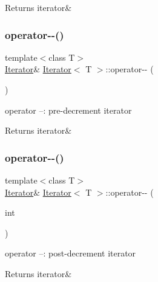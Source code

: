 \begin{DoxyReturn}{Returns}
iterator\& 
\end{DoxyReturn}
\mbox{\label{class_iterator_a580d645f1163cd20b92b469477324509}} 
\subsubsection{\texorpdfstring{operator-\/-\/()}{operator--()}\hspace{0.1cm}{\footnotesize\ttfamily [1/2]}}
{\footnotesize\ttfamily template$<$class T$>$ \\
\hyperlink{class_iterator}{Iterator}\& \hyperlink{class_iterator}{Iterator}$<$ T $>$\+::operator-\/-\/ (\begin{DoxyParamCaption}{ }\end{DoxyParamCaption})\hspace{0.3cm}{\ttfamily [inline]}}



operator --\+: pre-\/decrement iterator 

\begin{DoxyReturn}{Returns}
iterator\& 
\end{DoxyReturn}
\mbox{\label{class_iterator_a96b7f620a07d11a31335e8b43609625e}} 
\subsubsection{\texorpdfstring{operator-\/-\/()}{operator--()}\hspace{0.1cm}{\footnotesize\ttfamily [2/2]}}
{\footnotesize\ttfamily template$<$class T$>$ \\
\hyperlink{class_iterator}{Iterator}\& \hyperlink{class_iterator}{Iterator}$<$ T $>$\+::operator-\/-\/ (\begin{DoxyParamCaption}\item[{int}]{ }\end{DoxyParamCaption})\hspace{0.3cm}{\ttfamily [inline]}}



operator --\+: post-\/decrement iterator 

\begin{DoxyReturn}{Returns}
iterator\& 
\end{DoxyReturn}
\mbox{\label{class_iterator_a81ed85772dc6f8251fc5d65cf57b7fa8}} 
